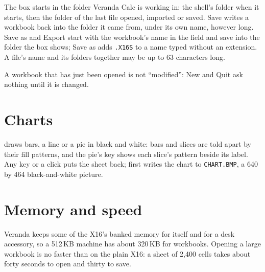 The box starts in the folder Veranda Calc is working in: the shell's
folder when it starts, then the folder of the last file opened, imported
or saved. Save writes a workbook back into the folder it came from, under
its own name, however long. Save as and Export start with the workbook's
name in the field and save into the folder the box shows; Save as adds
\texttt{.X16S} to a name typed without an extension. A file's name and its
folders together may be up to 63 characters long.

A workbook that has just been opened is not ``modified'': New and Quit ask
nothing until it is changed.

\section{Charts}

 draws bars, a line or a pie in black and white: bars and
slices are told apart by their fill patterns, and the pie's key shows each
slice's pattern beside its label. Any key or a click puts the sheet back;
 first writes the chart to \texttt{CHART.BMP}, a 640 by 464
black-and-white picture.

\section{Memory and speed}

Veranda keeps some of the X16's banked memory for itself and for a desk
accessory, so a 512\,KB machine has about 320\,KB for workbooks. Opening a
large workbook is no faster than on the plain X16: a sheet of 2,400 cells
takes about forty seconds to open and thirty to save.
